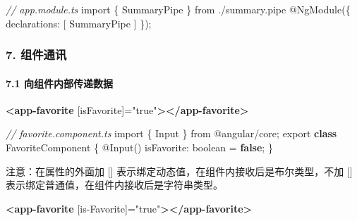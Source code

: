\documentclass[
]{article}
\newenvironment{Shaded}{}{}
\newcommand{\CommentTok}[1]{\textcolor[rgb]{0.38,0.63,0.69}{\textit{#1}}}
\newcommand{\DataTypeTok}[1]{\textcolor[rgb]{0.56,0.13,0.00}{#1}}
\newcommand{\FunctionTok}[1]{\textcolor[rgb]{0.02,0.16,0.49}{#1}}
\newcommand{\ImportTok}[1]{#1}
\newcommand{\KeywordTok}[1]{\textcolor[rgb]{0.00,0.44,0.13}{\textbf{#1}}}
\newcommand{\NormalTok}[1]{#1}
\newcommand{\OperatorTok}[1]{\textcolor[rgb]{0.40,0.40,0.40}{#1}}
\newcommand{\OtherTok}[1]{\textcolor[rgb]{0.00,0.44,0.13}{#1}}
\newcommand{\StringTok}[1]{\textcolor[rgb]{0.25,0.44,0.63}{#1}}
\begin{document}
\begin{Shaded}
\begin{Highlighting}[]
\CommentTok{// app.module.ts}
\ImportTok{import}\NormalTok{ \{ SummaryPipe \} from }\StringTok{\textquotesingle{}./summary.pipe\textquotesingle{}}
\NormalTok{@}\FunctionTok{NgModule}\NormalTok{(\{}
\NormalTok{    declarations}\OperatorTok{:}\NormalTok{ [}
\NormalTok{      SummaryPipe}
\NormalTok{    ] }
\NormalTok{\})}\OperatorTok{;}
\end{Highlighting}
\end{Shaded}

\hypertarget{7-ux7ec4ux4ef6ux901aux8baf}{%
\subsubsection{7. 组件通讯}\label{7-ux7ec4ux4ef6ux901aux8baf}}

\hypertarget{71-ux5411ux7ec4ux4ef6ux5185ux90e8ux4f20ux9012ux6570ux636e}{%
\paragraph{7.1
向组件内部传递数据}\label{71-ux5411ux7ec4ux4ef6ux5185ux90e8ux4f20ux9012ux6570ux636e}}

\begin{Shaded}
\begin{Highlighting}[]
\KeywordTok{\textless{}app{-}favorite}\OtherTok{ [isFavorite]=}\StringTok{"true"}\KeywordTok{\textgreater{}\textless{}/app{-}favorite\textgreater{}}
\end{Highlighting}
\end{Shaded}

\begin{Shaded}
\begin{Highlighting}[]
\CommentTok{// favorite.component.ts}
\ImportTok{import}\NormalTok{ \{ Input \} }\ImportTok{from} \StringTok{\textquotesingle{}@angular/core\textquotesingle{}}\OperatorTok{;}
\ImportTok{export} \KeywordTok{class}\NormalTok{ FavoriteComponent \{}
\NormalTok{    @}\FunctionTok{Input}\NormalTok{() }\DataTypeTok{isFavorite}\OperatorTok{:}\NormalTok{ boolean }\OperatorTok{=} \KeywordTok{false}\OperatorTok{;}
\NormalTok{\}}
\end{Highlighting}
\end{Shaded}

注意：在属性的外面加 {[}{]}
表示绑定动态值，在组件内接收后是布尔类型，不加 {[}{]}
表示绑定普通值，在组件内接收后是字符串类型。

\begin{Shaded}
\begin{Highlighting}[]
\KeywordTok{\textless{}app{-}favorite}\OtherTok{ [is{-}Favorite]=}\StringTok{"true"}\KeywordTok{\textgreater{}\textless{}/app{-}favorite\textgreater{}}
\end{Highlighting}
\end{Shaded}
\end{document}
